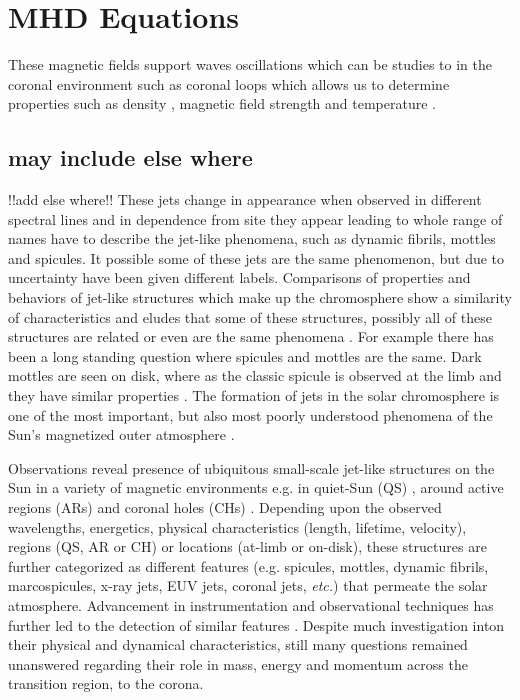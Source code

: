 \documentclass[12pt]{ociamthesis}
\newcommand{\np}{\\ \\}
\begin{document}
\section{MHD Equations}
\label{section:MHD_eqs}
These magnetic fields support waves oscillations which can be studies to in the coronal environment such as coronal loops which allows us to determine properties such as density \citep{Verwichte_2013A_A}, magnetic field strength \citep{Nakariakov_2001} and temperature \citep{De_Moortel_2003SoPh}.
\subsection{may include else where}
{\color{green} !!add else where!! }These jets change in appearance when observed in different spectral lines and in dependence from site they appear leading to whole range of names have to describe the jet-like phenomena, such as dynamic fibrils, mottles and spicules. It possible some of these jets are the same phenomenon, but due to uncertainty have been given different labels. Comparisons of properties and behaviors of jet-like structures which make up the chromosphere show a similarity of characteristics and eludes that some of these structures, possibly all of these structures are related or even are the same phenomena \cite{Porfir2016A}. For example there has been a long standing question where spicules and mottles are the same. Dark mottles are seen on disk, where as the classic spicule is observed at the limb and they have similar properties \cite{Pontieu2007ASPC}. The formation of jets in the solar chromosphere is one of the most important, but also most poorly understood phenomena of the Sun's magnetized outer atmosphere \citep{Hansteen2006ApJ}.

Observations reveal presence of ubiquitous small-scale jet-like structures on the Sun in a variety of magnetic environments e.g. in quiet-Sun (QS) \citep{Pontieu2007astroph2081D,Rouppe2007ApJ660L169R,Pereira2012,Pereira2014ApJ}, around active regions (ARs) \citep{Pontieu2007astroph2081D,Pereira2012,Rouppe2013ApJ77656R,Gafeira2017ApJS2296G} and coronal holes (CHs) \citep{Yamauchi2005ApJ629572Y,Moreno2008ApJ673L211M,Pereira2012,Young2015ApJ801124Y}. Depending upon the observed wavelengths, energetics, physical characteristics (length, lifetime, velocity), regions (QS, AR or CH) or locations (at-limb or on-disk), these structures are further categorized as different features (e.g. spicules, mottles, dynamic fibrils, marcospicules, x-ray jets, EUV jets, coronal jets, \textit{etc.}) that permeate the solar atmosphere. Advancement in instrumentation and observational techniques has further led to the detection of similar features \citep[\textit{e.g.}][]{Gafeira2017, Cho2019ApJ884L38C}. Despite much investigation inton their physical and dynamical characteristics, still many questions remained unanswered regarding their role in mass, energy and momentum across the transition region, to the corona. \np
\end{document}
